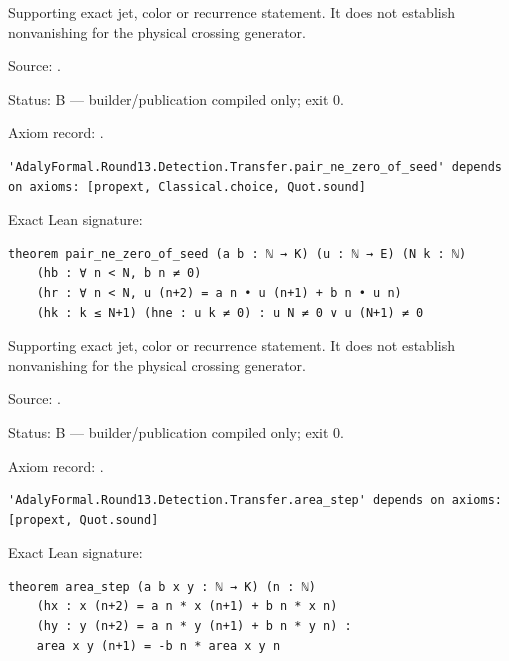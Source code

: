 \begin{theorem}[bp-508]
\label{bp-508}
\leanok
Supporting exact jet, color or recurrence statement. It does not establish nonvanishing for the physical crossing generator.

\par Source: \texttt{}.
\par Status: B — builder/publication compiled only; exit 0.
\par Axiom record: \texttt{}.
\begin{verbatim}
'AdalyFormal.Round13.Detection.Transfer.pair_ne_zero_of_seed' depends on axioms: [propext, Classical.choice, Quot.sound]
\end{verbatim}
\par Exact Lean signature:
\begin{verbatim}
theorem pair_ne_zero_of_seed (a b : ℕ → K) (u : ℕ → E) (N k : ℕ)
    (hb : ∀ n < N, b n ≠ 0)
    (hr : ∀ n < N, u (n+2) = a n • u (n+1) + b n • u n)
    (hk : k ≤ N+1) (hne : u k ≠ 0) : u N ≠ 0 ∨ u (N+1) ≠ 0
\end{verbatim}
\end{theorem}

\begin{theorem}[bp-509]
\label{bp-509}
\uses{}
\leanok
Supporting exact jet, color or recurrence statement. It does not establish nonvanishing for the physical crossing generator.

\par Source: \texttt{}.
\par Status: B — builder/publication compiled only; exit 0.
\par Axiom record: \texttt{}.
\begin{verbatim}
'AdalyFormal.Round13.Detection.Transfer.area_step' depends on axioms: [propext, Quot.sound]
\end{verbatim}
\par Exact Lean signature:
\begin{verbatim}
theorem area_step (a b x y : ℕ → K) (n : ℕ)
    (hx : x (n+2) = a n * x (n+1) + b n * x n)
    (hy : y (n+2) = a n * y (n+1) + b n * y n) :
    area x y (n+1) = -b n * area x y n
\end{verbatim}
\end{theorem}

